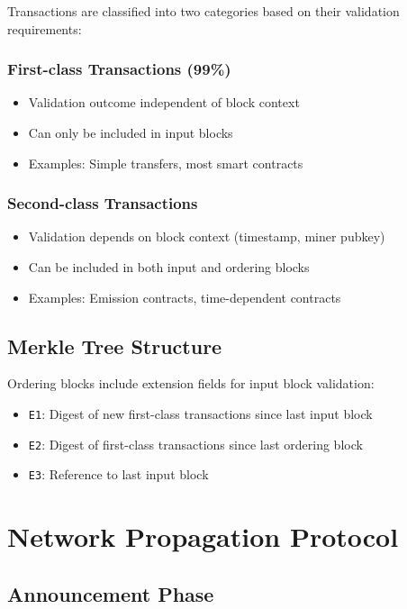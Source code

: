 \documentclass{llncs}
\newcommand{\code}[1]{\texttt{#1}}
\begin{document}
Transactions are classified into two categories based on their validation requirements:

\subsubsection{First-class Transactions (99\%)}
\begin{itemize}
\item Validation outcome independent of block context
\item Can only be included in input blocks
\item Examples: Simple transfers, most smart contracts
\end{itemize}

\subsubsection{Second-class Transactions}
\begin{itemize}
\item Validation depends on block context (timestamp, miner pubkey)
\item Can be included in both input and ordering blocks
\item Examples: Emission contracts, time-dependent contracts
\end{itemize}

\subsection{Merkle Tree Structure}

Ordering blocks include extension fields for input block validation:

\begin{itemize}
\item \code{E1}: Digest of new first-class transactions since last input block
\item \code{E2}: Digest of first-class transactions since last ordering block
\item \code{E3}: Reference to last input block
\end{itemize}

\section{Network Propagation Protocol}

\subsection{Announcement Phase}
\end{document}
